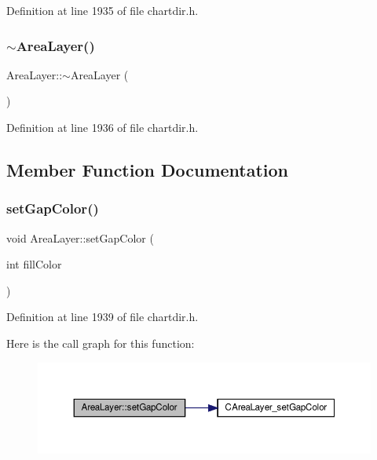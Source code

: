Definition at line 1935 of file chartdir.\+h.

\mbox{\label{class_area_layer_ac7ee192b99d13cdaead0010e9cc99a74}} 
\subsubsection{\texorpdfstring{$\sim$\+Area\+Layer()}{~AreaLayer()}}
{\footnotesize\ttfamily Area\+Layer\+::$\sim$\+Area\+Layer (\begin{DoxyParamCaption}{ }\end{DoxyParamCaption})\hspace{0.3cm}{\ttfamily [inline]}}



Definition at line 1936 of file chartdir.\+h.



\subsection{Member Function Documentation}
\mbox{\label{class_area_layer_a2bb65eb13524a34d5ab090b48bde062b}} 
\subsubsection{\texorpdfstring{set\+Gap\+Color()}{setGapColor()}}
{\footnotesize\ttfamily void Area\+Layer\+::set\+Gap\+Color (\begin{DoxyParamCaption}\item[{int}]{fill\+Color }\end{DoxyParamCaption})\hspace{0.3cm}{\ttfamily [inline]}}



Definition at line 1939 of file chartdir.\+h.

Here is the call graph for this function\+:
\nopagebreak
\begin{figure}[H]
\begin{center}
\leavevmode
\includegraphics[width=350pt]{class_area_layer_a2bb65eb13524a34d5ab090b48bde062b_cgraph}
\end{center}
\end{figure}
\mbox{\label{class_area_layer_a5db68f656bcb69c9064e4553de75f0f7}} 
